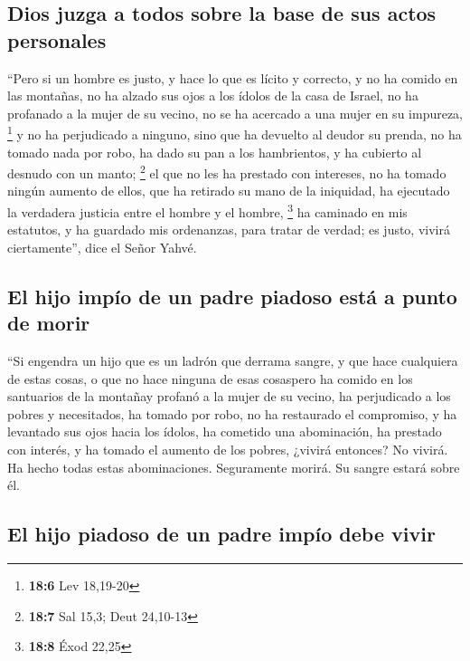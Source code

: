 \begin{paracol}{2}
\hypertarget{dios-juzga-a-todos-sobre-la-base-de-sus-actos-personales}{%
\subsection{Dios juzga a todos sobre la base de sus actos
personales}\label{dios-juzga-a-todos-sobre-la-base-de-sus-actos-personales}}

 ``Pero si un hombre es justo, y hace lo que es lícito y
correcto,  y no ha comido en las montañas, no ha alzado
sus ojos a los ídolos de la casa de Israel, no ha profanado a la mujer
de su vecino, no se ha acercado a una mujer en su impureza, \footnote{\textbf{18:6}
  Lev 18,19-20}  y no ha perjudicado a ninguno, sino que
ha devuelto al deudor su prenda, no ha tomado nada por robo, ha dado su
pan a los hambrientos, y ha cubierto al desnudo con un manto;
\footnote{\textbf{18:7} Sal 15,3; Deut 24,10-13}  el que
no les ha prestado con intereses, no ha tomado ningún aumento de ellos,
que ha retirado su mano de la iniquidad, ha ejecutado la verdadera
justicia entre el hombre y el hombre, \footnote{\textbf{18:8} Éxod 22,25}
 ha caminado en mis estatutos, y ha guardado mis
ordenanzas, para tratar de verdad; es justo, vivirá ciertamente'', dice
el Señor Yahvé.

\hypertarget{el-hijo-impuxedo-de-un-padre-piadoso-estuxe1-a-punto-de-morir}{%
\subsection{El hijo impío de un padre piadoso está a punto de
morir}\label{el-hijo-impuxedo-de-un-padre-piadoso-estuxe1-a-punto-de-morir}}

 ``Si engendra un hijo que es un ladrón que derrama
sangre, y que hace cualquiera de estas cosas,  o que no
hace ninguna de esas cosaspero ha comido en los santuarios de la
montañay profanó a la mujer de su vecino,  ha perjudicado
a los pobres y necesitados, ha tomado por robo, no ha restaurado el
compromiso, y ha levantado sus ojos hacia los ídolos, ha cometido una
abominación,  ha prestado con interés, y ha tomado el
aumento de los pobres, ¿vivirá entonces? No vivirá. Ha hecho todas estas
abominaciones. Seguramente morirá. Su sangre estará sobre él.

\hypertarget{el-hijo-piadoso-de-un-padre-impuxedo-debe-vivir}{%
\subsection{El hijo piadoso de un padre impío debe
vivir}\label{el-hijo-piadoso-de-un-padre-impuxedo-debe-vivir}}


\end{paracol}
